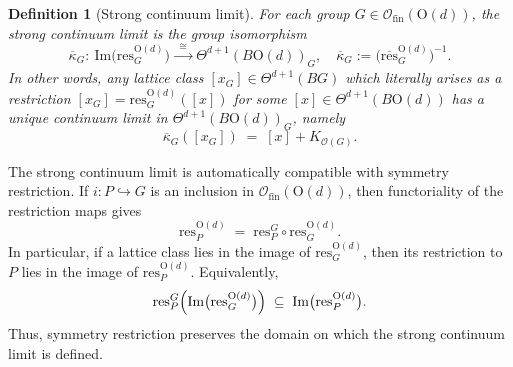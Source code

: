 \documentclass[aps,prx,reprint,superscriptaddress,twocolumn,amsmath,amssymb,amsfonts, nofootinbib]{revtex4-2}
\newcommand{\ofin}{\mathcal{O}_{\text{fin}}}
\newcommand{\res}{\text{res}}
\theoremstyle{apsstyle}
\newtheorem{definition}[theorem]{Definition}
\begin{document}
\medskip

\begin{definition}[Strong continuum limit]
\label{def:strong_con_lim}
For each group $G\in\ofin(\mathrm{O}(d))$, the \emph{strong continuum limit} is the group isomorphism
\begin{equation}
    \overline{\kappa}_{G}:\ 
    \mathrm{Im}\bigl(\res^{\mathrm{O}(d)}_{G}\bigr)
    \xrightarrow[]{\;\;\cong\;\;}
    \Theta^{d+1}(B\mathrm{O}(d))_{G},
    \quad
    \overline{\kappa}_{G}
    :=
    \bigl(\overline{\res}^{\mathrm{O}(d)}_{G}\bigr)^{-1}.
    \label{eq:strong_continuum_limit}
\end{equation}
In other words, any lattice class $[x_{G}]\in\Theta^{d+1}(BG)$ which literally arises
as a restriction $[x_{G}]=\res^{\mathrm{O}(d)}_{G}([x])$ for some
$[x]\in\Theta^{d+1}(B\mathrm{O}(d))$ has a unique continuum limit in $\Theta^{d+1}(B\mathrm{O}(d))_{G}$,
namely
\begin{equation*}
    \overline{\kappa}_{G}([x_{G}])
    \;=\; [x]+ K_{\mathcal{O}(G)}.
\end{equation*}
\end{definition}

The strong continuum limit is automatically compatible with symmetry restriction. If $i:P\hookrightarrow G$ is an inclusion in $\ofin(\mathrm{O}(d))$, then
functoriality of the restriction maps gives
\begin{equation*}
    \res^{\mathrm{O}(d)}_{P}
    \;=\;
    \res^{G}_{P}\circ\res^{\mathrm{O}(d)}_{G}.
\end{equation*}
In particular, if a lattice class lies in the image of $\res^{\mathrm{O}(d)}_{G}$, then its restriction to $P$ lies in the image of $\res^{\mathrm{O}(d)}_{P}$. Equivalently,
\begin{equation}
\res^{G}_{P}\Bigl(\mathrm{Im}\bigl(\res^{\mathrm{O}(d)}_{G}\bigr)\Bigr)
    \;\subseteq\;
    \mathrm{Im}\bigl(\res^{\mathrm{O}(d)}_{P}\bigr).
    \label{eq:image_subfunctor_prop}
\end{equation}
Thus, symmetry restriction preserves the domain on which the strong continuum limit is defined. 
\end{document}
